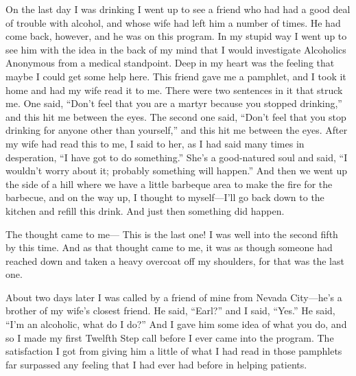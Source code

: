\begin{biblechapter}
\verse On the last day I was drinking 
    I went up to see a friend 
    who had had a good deal of trouble with alcohol, 
    and whose wife had left him a number of times.
\verse He had come back, however, 
    and he was on this program.
\verse In my stupid way I went up to see him 
    with the idea in the back of my mind that 
    I would investigate Alcoholics Anonymous 
    from a medical standpoint.
\verse Deep in my heart was the feeling that 
    maybe I could get some help here.
\verse This friend gave me a pamphlet, 
    and I took it home and had my wife read it to me.
\verse There were two sentences in it that struck me.
\verse One said, 
    “Don’t feel that you are a martyr because you stopped drinking,” 
    and this hit me between the eyes.
\verse The second one said, 
    “Don’t feel that you stop drinking for anyone other than yourself,” 
    and this hit me between the eyes.
\verse After my wife had read this to me, 
    I said to her, as I had said many times in desperation, 
    “I have got to do something.”
\verse She’s a good-natured soul and said, 
    “I wouldn’t worry about it; probably something will happen.”
\verse And then we went up the side of a hill 
    where we have a little barbeque area 
    to make the fire for the barbecue, 
    and on the way up, 
    I thought to myself—I’ll go back down to the kitchen 
    and refill this drink.
\verse And just then something did happen.

\verse The thought came to me— This is the last one!
\verse I was well into the second fifth by this time.
\verse And as that thought came to me, 
    it was as though someone had reached down 
    and taken a heavy overcoat off my shoulders, 
    for that was the last one.
\end{biblechapter}


\begin{biblechapter}
\verse About two days later I was called by a friend of mine 
    from Nevada City—he’s a brother of my wife’s closest friend.
\verse He said, “Earl?” and I said, “Yes.”
\verse He said, “I’m an alcoholic, what do I do?”
\verse And I gave him some idea of what you do, 
    and so I made my first Twelfth Step call 
    before I ever came into the program.
\verse The satisfaction I got 
    from giving him a little of what I had read in those pamphlets 
    far surpassed 
    any feeling that I had ever had before in helping patients.
\end{biblechapter}


